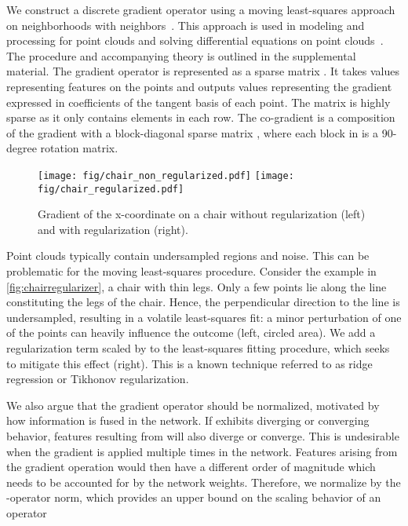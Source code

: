 \documentclass[acmtog, authorversion]{acmart}
\begin{document}
We construct a discrete gradient operator using a moving least-squares approach on neighborhoods with  neighbors~\cite{Nealen2004}. This approach is used in modeling and processing for point clouds and solving differential equations on point clouds~\cite{crane2013geodesics, Liang2013SolvingPD}. The procedure and accompanying theory is outlined in the supplemental material. The gradient operator is represented as a sparse matrix . It takes  values representing features on the points and outputs  values representing the gradient expressed in coefficients of the tangent basis of each point. The matrix is highly sparse as it only contains  elements in each row. The co-gradient  is a composition of the gradient with a block-diagonal sparse matrix , where each block in  is a  90-degree rotation matrix.

\begin{figure}[b]
    \centering
        \texttt{[image: fig/chair\_non\_regularized.pdf]}
        \texttt{[image: fig/chair\_regularized.pdf]}
    \caption{Gradient of the x-coordinate on a chair without regularization (left) and with regularization (right).
    }
    \label{fig:chairregularizer}
\end{figure}

Point clouds typically contain undersampled regions and noise. This can be problematic for the moving least-squares procedure. Consider the example in \autoref{fig:chairregularizer}, a chair with thin legs. Only a few points lie along the line constituting the legs of the chair. Hence, the perpendicular direction to the line is undersampled, resulting in a volatile least-squares fit: a minor perturbation of one of the points can heavily influence the outcome (left, circled area). We add a regularization term scaled by  to the least-squares fitting procedure, which seeks to mitigate this effect (right). This is a known technique referred to as ridge regression or Tikhonov regularization.

We also argue that the gradient operator should be normalized, motivated by how information is fused in the network. If  exhibits diverging or converging behavior, features resulting from  will also diverge or converge. This is undesirable when the gradient is applied multiple times in the network. Features arising from the gradient operation would then have a different order of magnitude which needs to be accounted for by the network weights. Therefore, we normalize  by the  -operator norm, which provides an upper bound on the scaling behavior of an operator
\end{document}
